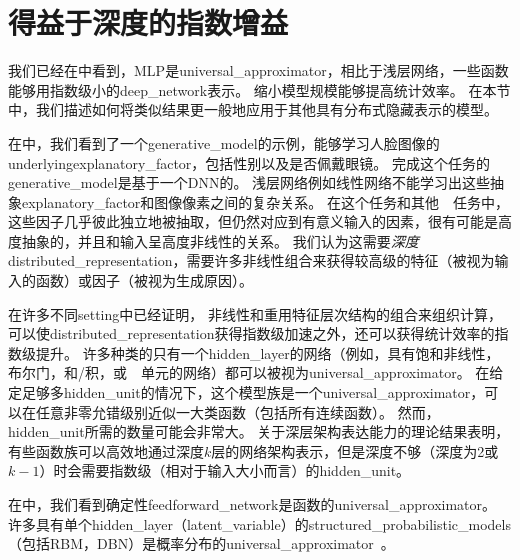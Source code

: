 
\section{得益于深度的指数增益}
\label{sec:exponential_gains_from_depth}
我们已经在中看到，\gls{MLP}是\gls{universal_approximator}，相比于浅层网络，一些函数能够用指数级小的\gls{deep_network}表示。
缩小模型规模能够提高统计效率。
在本节中，我们描述如何将类似结果更一般地应用于其他具有分布式隐藏表示的模型。


在中，我们看到了一个\gls{generative_model}的示例，能够学习人脸图像的\gls{underlying}\gls{explanatory_factor}，包括性别以及是否佩戴眼镜。
完成这个任务的\gls{generative_model}是基于一个\gls{DNN}的。
浅层网络例如线性网络不能学习出这些抽象\gls{explanatory_factor}和图像像素之间的复杂关系。
在这个任务和其他~~任务中，这些因子几乎彼此独立地被抽取，但仍然对应到有意义输入的因素，很有可能是高度抽象的，并且和输入呈高度非线性的关系。
我们认为这需要\emph{深度}\gls{distributed_representation}，需要许多非线性组合来获得较高级的特征（被视为输入的函数）或因子（被视为生成原因）。


在许多不同\gls{setting}中已经证明，
非线性和重用特征层次结构的组合来组织计算，可以使\gls{distributed_representation}获得指数级加速之外，还可以获得统计效率的指数级提升。
许多种类的只有一个\gls{hidden_layer}的网络（例如，具有饱和非线性，布尔门，和/积，或~~单元的网络）都可以被视为\gls{universal_approximator}。
在给定足够多\gls{hidden_unit}的情况下，这个模型族是一个\gls{universal_approximator}，可以在任意非零允错级别近似一大类函数（包括所有连续函数）。
然而，\gls{hidden_unit}所需的数量可能会非常大。
关于深层架构表达能力的理论结果表明，有些函数族可以高效地通过深度$k$层的网络架构表示，但是深度不够（深度为2或$k-1$）时会需要指数级（相对于输入大小而言）的\gls{hidden_unit}。



在中，我们看到确定性\gls{feedforward_network}是函数的\gls{universal_approximator}。
许多具有单个\gls{hidden_layer}（\gls{latent_variable}）的\gls{structured_probabilistic_models}（包括\gls{RBM}，\gls{DBN}）是概率分布的\gls{universal_approximator}~\citep{LeRoux-Bengio-2007-TR,Montufar-2011,Montufar-et-al-NIPS2014,Krause-et-al-ICML2013}。

